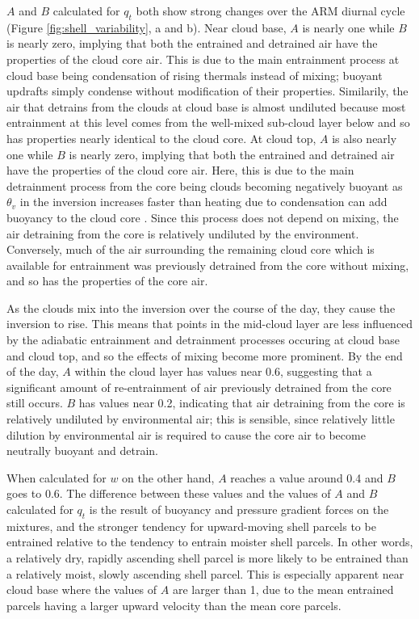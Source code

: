 \documentclass[12pt]{article}
\begin{document}
$A$ and $B$ calculated for $q_t$ both show strong changes over the ARM diurnal 
cycle (Figure \ref{fig:shell_variability}, a and b).  Near cloud base, $A$ is 
nearly one while $B$ is nearly zero, implying that both the entrained and 
detrained air have the properties of the cloud core air.  This is due to the 
main entrainment process at cloud base being condensation of rising thermals
instead of mixing; buoyant updrafts simply condense without modification of 
their properties.  Similarily, the air that detrains from the clouds at cloud 
base is almost undiluted because most entrainment at this level comes from the 
well-mixed sub-cloud layer below and so has properties nearly identical to the 
cloud core.  At cloud top, $A$ is also nearly one while $B$ is nearly zero, 
implying that both the entrained and detrained air have the properties of the 
cloud core air.  Here, this is due to the main detrainment process from the 
core being clouds becoming negatively buoyant as $\theta_v$ in the inversion 
increases faster than heating due to condensation can add buoyancy to the cloud 
core \citep{Wu2009}.  Since this process does not depend on mixing, the air 
detraining from the core is relatively undiluted by the environment.  
Conversely, much of the air surrounding the remaining cloud core which is 
available for entrainment was previously detrained from the core without 
mixing, and so has the properties of the core air.

As the clouds mix into the inversion over the course of the day, they cause the 
inversion to rise.  This means that points in the mid-cloud layer are less 
influenced by the adiabatic entrainment and detrainment processes occuring at 
cloud base and cloud top, and so the effects of mixing become more prominent.  
By the end of the day, $A$ within the cloud layer has values near 0.6, 
suggesting that a significant amount of re-entrainment of air previously 
detrained from the core still occurs.  $B$ has values near 0.2, indicating that 
air detraining from the core is relatively undiluted by environmental air; this 
is sensible, since relatively little dilution by environmental air is required 
to cause the core air to become neutrally buoyant and detrain.

When calculated for $w$ on the other hand, $A$ reaches a value around 
0.4 and $B$ goes to 0.6. The difference between these values and the values of 
$A$ and $B$ calculated for $q_t$ is the result of buoyancy and pressure 
gradient forces on the mixtures, and the stronger tendency for upward-moving 
shell parcels to be entrained relative to the tendency to entrain moister shell 
parcels.  In other words, a relatively dry, rapidly ascending shell parcel is 
more likely to be entrained than a relatively moist, slowly ascending shell 
parcel. This is especially apparent near cloud base where the values of $A$ 
are larger than 1, due to the mean entrained parcels having a larger upward 
velocity than the mean core parcels.
\end{document}
